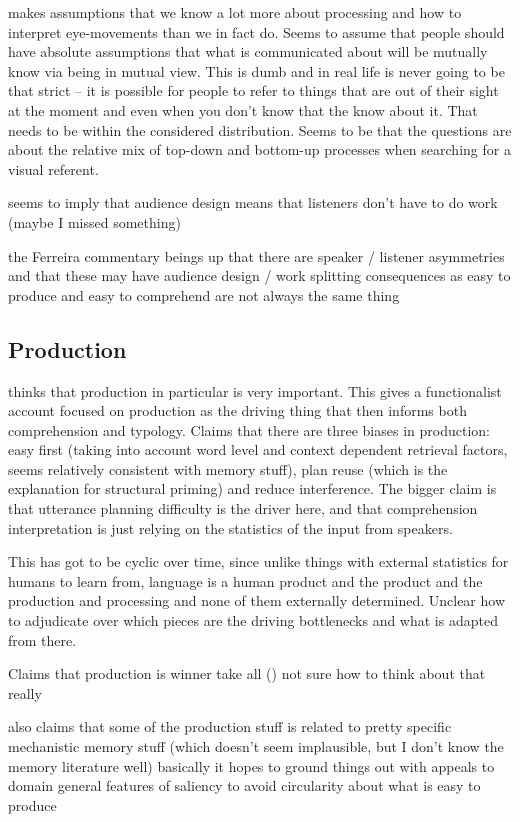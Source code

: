 \documentclass[]{article}
\begin{document}
\cite{keysar2000} makes assumptions that we know a lot more about processing and how to interpret eye-movements than we in fact do. Seems to assume that people should have absolute assumptions that what is communicated about will be mutually know via being in mutual view. This is dumb and in real life is never going to be that strict -- it is possible for people to refer to things that are out of their sight at the moment and even when you don't know that the know about it. That needs to be within the considered distribution. Seems to be that the questions are about the relative mix of top-down and bottom-up processes when searching for a visual referent. 

\cite{keysar2000} seems to imply that audience design means that listeners don't have to do work (maybe I missed something) 

\cite{pickering2004} the Ferreira commentary beings up that there are speaker / listener asymmetries and that these may have audience design / work splitting consequences as easy to produce and easy to comprehend are not always the same thing 

\subsection{Production}

\cite{macdonald2013} thinks that production in particular is very important. This gives a functionalist account focused on production as the driving thing that then informs both comprehension and typology. Claims that there are three biases in production: easy first (taking into account word level and context dependent retrieval factors, seems relatively consistent with memory stuff), plan reuse (which is the explanation for structural priming) and reduce interference. The bigger claim is that utterance planning difficulty is the driver here, and that comprehension interpretation is just relying on the statistics of the input from speakers. 

This has got to be cyclic over time, since unlike things with external statistics for humans to learn from, language is a human product and the product and the production and processing and none of them externally determined. Unclear how to adjudicate over which pieces are the driving bottlenecks and what is adapted from there. 

Claims that production is winner take all (\cite{macdonald2013}) not sure how to think about that really 

\cite{macdonald2013} also claims that some of the production stuff is related to pretty specific mechanistic memory stuff (which doesn't seem implausible, but I don't know the memory literature well) basically it hopes to ground things out with appeals to domain general features of saliency to avoid circularity about what is easy to produce 
\end{document}
